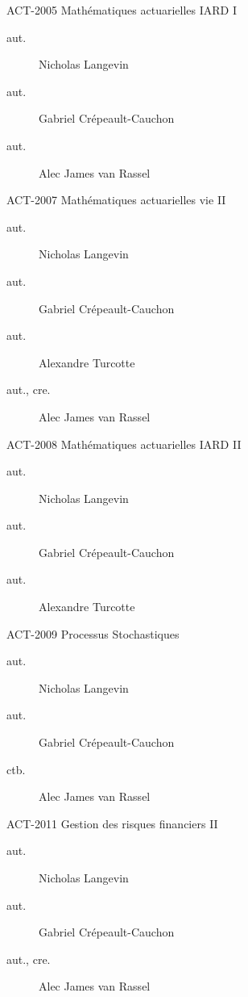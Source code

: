 \documentclass[10pt, french]{article}
\begin{document}
\begin{multicols*}{2}
\begin{contrib}{ACT-2005\: Mathématiques actuarielles IARD I}
\begin{description}
	\item[aut.] Nicholas Langevin
	\item[aut.] Gabriel Crépeault-Cauchon 
	\item[aut.] Alec James van Rassel
\end{description}
\end{contrib}

\begin{contrib}{ACT-2007\: Mathématiques actuarielles vie II}
\begin{description}
	\item[aut.] Nicholas Langevin
	\item[aut.] Gabriel Crépeault-Cauchon 
	\item[aut.] Alexandre Turcotte 
	\item[aut., cre.] Alec James van Rassel
\end{description}
\end{contrib}

\begin{contrib}{ACT-2008\: Mathématiques actuarielles IARD II}
\begin{description}
	\item[aut.] Nicholas Langevin
	\item[aut.] Gabriel Crépeault-Cauchon 
	\item[aut.] Alexandre Turcotte 
\end{description}
\end{contrib}

\begin{contrib}{ACT-2009\: Processus Stochastiques}
\begin{description}
	\item[aut.] Nicholas Langevin
	\item[aut.] Gabriel Crépeault-Cauchon 
	\item[ctb.] Alec James van Rassel
\end{description}
\end{contrib}

\begin{contrib}{ACT-2011\: Gestion des risques financiers II}
\begin{description}
	\item[aut.] Nicholas Langevin
	\item[aut.] Gabriel Crépeault-Cauchon 
	\item[aut., cre.] Alec James van Rassel
\end{description}
\end{contrib}


\end{multicols*}
\end{document}
